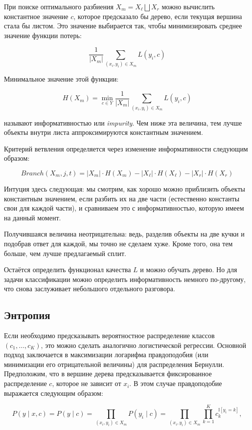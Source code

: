 При поиске оптимального разбиения $X_m = X_\ell \bigsqcup X_r$ можно вычислить константное значение $c$, которое предсказало бы дерево, если текущая вершина стала бы листом. Это значение выбирается так, чтобы минимизировать среднее значение функции потерь:

\[
\frac{1}{|X_m|} \sum_{(x_i, y_i) \in X_m} L(y_i, c)
\]

Минимальное значение этой функции:

\[
H(X_m) = \min_{c \in Y} \frac{1}{|X_m|} \sum_{(x_i, y_i) \in X_m} L(y_i, c)
\]

называют информативностью или \textit{impurity}. Чем ниже эта величина, тем лучше объекты внутри листа аппроксимируются константным значением.

Критерий ветвления определяется через изменение информативности следующим образом:

\[
Branch(X_m, j, t) = |X_m| \cdot H(X_m) - |X_\ell| \cdot H(X_\ell) - |X_r| \cdot H(X_r)
\]

Интуция здесь следующая: мы смотрим, как хорошо можно приблизить объекты константным значением, если разбить их на две части (естественно константы свои для каждой части), и сравниваем это с информативностью, которую имеем на данный момент.

Получившаяся величина неотрицательна: ведь, разделив объекты на две кучки и подобрав ответ для каждой, мы точно не сделаем хуже. Кроме того, она тем больше, чем лучше предлагаемый сплит.

Остаётся определить функционал качества $L$ и можно обучать дерево. Но для задачи классификации можно определить информативность немного по-другому, что снова заслуживает небольшого отдельного разговора.

\subsection{Энтропия}
Если необходимо предсказывать вероятностное распределение классов $(c_1, \dots, c_K)$, это можно сделать аналогично логистической регрессии. Основной подход заключается в максимизации логарифма правдоподобия (или минимизации его отрицательной величины) для распределения Бернулли. Предположим, что в вершине дерева предсказывается фиксированное распределение $c$, которое не зависит от $x_i$. В этом случае правдоподобие выражается следующим образом:

\[
P(y \mid x, c) = P(y \mid c) = \prod_{(x_i, y_i) \in X_m} P(y_i \mid c) = \prod_{(x_i, y_i) \in X_m} \prod_{k=1}^K c_k^{\mathbb{I}[y_i = k]},
\]

